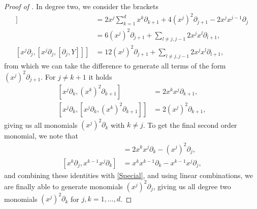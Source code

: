 \documentclass[10pt,a4paper]{amsart}
\begin{document}
\begin{proof}[Proof of ]
In degree two, we consider the brackets
\begin{align}
[x^j \partial_j, [\partial_j, Y]] &= 2 x^j \sum_{k=1}^d x^k \partial_{k+1} + 4 (x^j)^2 \partial_{j+1} - 2 x^j x^{j-1} \partial_{j} \\
& = 6(x^j)^2 \partial_{j+1} + \sum_{l \neq j, j-1} 2x^j x^l \partial_{l+1} , \\
[x^j \partial_j, [x^j \partial_j, [\partial_j, Y]]] & = 12(x^j)^2 \partial_{j+1} + \sum_{l \neq j, j-1} 2x^j x^l \partial_{l+1} ,
\end{align}
from which we can take the difference to generate all terms of the form $(x^j)^2 \partial_{j+1}$.  For $j \neq k+1$ it holds
\begin{align} \label{Special}
[x^j\partial_k, (x^k)^2\partial_{k+1}] &= 2x^kx^j \partial_{k+1} ,\\
[x^j\partial_k, [x^j\partial_k, (x^k)^2\partial_{k+1}]] &= 2(x^j)^2 \partial_{k+1} ,
\end{align}
giving us all monomials $(x^j)^2 \partial_k$ with $k \neq j$. To get the final second order monomial, we note that
\begin{align}[x^k \partial_j, (x^j)^2 \partial_k] &= 2x^k x^j \partial_k - (x^j)^2 \partial_j, \\
[x^k \partial_{j}, x^{k-1} x^j \partial_k] &= x^k x^{k-1} \partial_k - x^{k-1} x^j \partial_{j} ,
\end{align}
and combining these identities with \eqref{Special}, and using linear combinations, we are finally able to generate monomials $(x^j)^2 \partial_j$, giving us all degree two monomials $(x^j)^2\partial_k$ for $j,k = 1, \dots, d$.


\end{proof}
\end{document}

